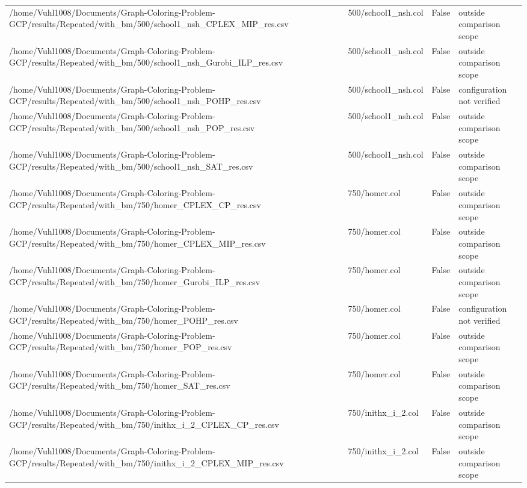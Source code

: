 \begin{table}[htbp]
\begin{tabular}{llll}
/home/Vuhl1008/Documents/Graph-Coloring-Problem-GCP/results/Repeated/with\_bm/500/school1\_nsh\_CPLEX\_MIP\_res.csv & 500/school1\_nsh.col & False & outside comparison scope \\
/home/Vuhl1008/Documents/Graph-Coloring-Problem-GCP/results/Repeated/with\_bm/500/school1\_nsh\_Gurobi\_ILP\_res.csv & 500/school1\_nsh.col & False & outside comparison scope \\
/home/Vuhl1008/Documents/Graph-Coloring-Problem-GCP/results/Repeated/with\_bm/500/school1\_nsh\_POHP\_res.csv & 500/school1\_nsh.col & False & configuration not verified \\
/home/Vuhl1008/Documents/Graph-Coloring-Problem-GCP/results/Repeated/with\_bm/500/school1\_nsh\_POP\_res.csv & 500/school1\_nsh.col & False & outside comparison scope \\
/home/Vuhl1008/Documents/Graph-Coloring-Problem-GCP/results/Repeated/with\_bm/500/school1\_nsh\_SAT\_res.csv & 500/school1\_nsh.col & False & outside comparison scope \\
/home/Vuhl1008/Documents/Graph-Coloring-Problem-GCP/results/Repeated/with\_bm/750/homer\_CPLEX\_CP\_res.csv & 750/homer.col & False & outside comparison scope \\
/home/Vuhl1008/Documents/Graph-Coloring-Problem-GCP/results/Repeated/with\_bm/750/homer\_CPLEX\_MIP\_res.csv & 750/homer.col & False & outside comparison scope \\
/home/Vuhl1008/Documents/Graph-Coloring-Problem-GCP/results/Repeated/with\_bm/750/homer\_Gurobi\_ILP\_res.csv & 750/homer.col & False & outside comparison scope \\
/home/Vuhl1008/Documents/Graph-Coloring-Problem-GCP/results/Repeated/with\_bm/750/homer\_POHP\_res.csv & 750/homer.col & False & configuration not verified \\
/home/Vuhl1008/Documents/Graph-Coloring-Problem-GCP/results/Repeated/with\_bm/750/homer\_POP\_res.csv & 750/homer.col & False & outside comparison scope \\
/home/Vuhl1008/Documents/Graph-Coloring-Problem-GCP/results/Repeated/with\_bm/750/homer\_SAT\_res.csv & 750/homer.col & False & outside comparison scope \\
/home/Vuhl1008/Documents/Graph-Coloring-Problem-GCP/results/Repeated/with\_bm/750/inithx\_i\_2\_CPLEX\_CP\_res.csv & 750/inithx\_i\_2.col & False & outside comparison scope \\
/home/Vuhl1008/Documents/Graph-Coloring-Problem-GCP/results/Repeated/with\_bm/750/inithx\_i\_2\_CPLEX\_MIP\_res.csv & 750/inithx\_i\_2.col & False & outside comparison scope \\

\end{tabular}
\end{table}
